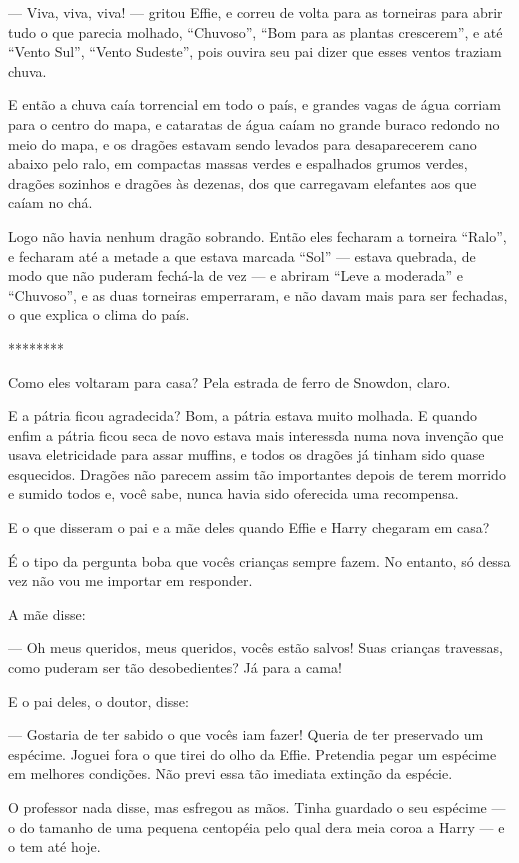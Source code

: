 — Viva, viva, viva! — gritou Effie, e correu de volta para as
torneiras para abrir tudo o que parecia molhado, “Chuvoso”, “Bom para
as plantas crescerem”, e até “Vento Sul”, “Vento Sudeste”, pois
ouvira seu pai dizer que esses ventos traziam chuva.

E então a chuva caía torrencial em todo o país, e grandes vagas de
água corriam para o centro do mapa, e cataratas de água caíam no
grande buraco redondo no meio do mapa, e os dragões estavam sendo
levados para desaparecerem cano abaixo pelo ralo, em compactas massas
verdes e espalhados grumos verdes, dragões sozinhos e dragões às
dezenas, dos que carregavam elefantes aos que caíam no chá.

Logo não havia nenhum dragão sobrando. Então eles fecharam a torneira
“Ralo”, e fecharam até a metade a que estava marcada “Sol” — estava
quebrada, de modo que não puderam fechá-la de vez — e abriram “Leve a
moderada” e “Chuvoso”, e as duas torneiras emperraram, e não davam
mais para ser fechadas, o que explica o clima do país.

********

 Como eles voltaram para casa? Pela estrada de ferro de Snowdon,
claro.

E a pátria ficou agradecida? Bom, a pátria estava muito molhada. E
quando enfim a pátria ficou seca de novo estava mais interessda numa
nova invenção que usava eletricidade para assar muffins, e todos os
dragões já tinham sido quase esquecidos. Dragões não parecem assim
tão importantes depois de terem morrido e sumido todos e, você sabe,
nunca havia sido oferecida uma recompensa.

E o que disseram o pai e a mãe deles quando Effie e Harry chegaram em
casa?

É o tipo da pergunta boba que vocês crianças sempre fazem. No entanto,
só dessa vez não vou me importar em responder.

A mãe disse:

— Oh meus queridos, meus queridos, vocês estão salvos! Suas crianças
travessas, como puderam ser tão desobedientes? Já para a cama!

E o pai deles, o doutor, disse:

— Gostaria de ter sabido o que vocês iam fazer! Queria de ter
preservado um espécime. Joguei fora o que tirei do olho da Effie.
Pretendia pegar um espécime em melhores condições. Não previ essa tão
imediata extinção da espécie.

O professor nada disse, mas esfregou as mãos. Tinha guardado o seu
espécime — o do tamanho de uma pequena centopéia pelo qual dera meia
coroa a Harry — e o tem até hoje.

